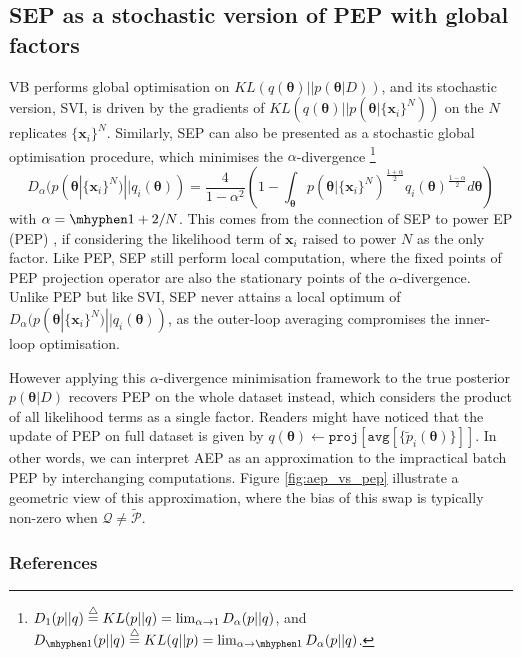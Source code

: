 \documentclass{article} %
\begin{document}
\subsection{SEP as a stochastic version of PEP with global factors}
VB performs global optimisation on $KL(q(\bm{\theta})||p(\bm{\theta}|D))$, and its stochastic version, SVI, is driven by the gradients of $KL(q(\bm{\theta}) || p(\bm{\theta} | \{\bm{x}_i\}^N))$ on the $N$ replicates $\{\bm{x}_i\}^N$. Similarly, SEP can also be presented as a stochastic global optimisation procedure, which minimises the $\alpha$-divergence \footnote{$D_{1}(p||q) \buildrel\triangle\over = KL(p || q) = \lim_{\alpha \rightarrow 1} D_{\alpha}(p||q)$, and $D_{ \mhyphen 1}(p||q) \buildrel\triangle\over = KL(q || p) = \lim_{\alpha \rightarrow \mhyphen 1} D_{\alpha}(p || q)$. } \cite{amari:ig1985}
\begin{equation}
D_{\alpha}(p(\bm{\theta} | \{\bm{x}_i\}^N) || q_i(\bm{\theta})) = \frac{4}{1 - \alpha^2} 
		\left( 1 - \int_{\bm{\theta}} p(\bm{\theta} | \{\bm{x}_i\}^N)^{\frac{1+\alpha}{2}} q_i(\bm{\theta})^{\frac{1-\alpha}{2}} d\bm{\theta} \right)
\end{equation} 
with $\alpha = \mhyphen 1 + 2/N$. This comes from the connection of SEP to power EP (PEP) \cite{minka:powerep}, if considering the likelihood term of $\bm{x}_i$ raised to power $N$ as the only factor. Like PEP, SEP still perform local computation, where the fixed points of PEP projection operator are also the stationary points of the $\alpha$-divergence. Unlike PEP but like SVI, SEP never attains a local optimum of $D_{\alpha}(p(\bm{\theta} | \{\bm{x}_i\}^N) || q_i(\bm{\theta}))$, as the outer-loop averaging compromises the inner-loop optimisation.

%
However applying this $\alpha$-divergence minimisation framework to the true posterior $p(\bm{\theta}|D)$ recovers PEP on the whole dataset instead, which considers the product of all likelihood terms as a single factor. Readers might have noticed that the update of PEP on full dataset is given by $q(\bm{\theta}) \leftarrow \mathtt{proj}[\mathtt{avg}[\{ \tilde{p}_i(\bm{\theta}) \}]]$. In other words, we can interpret AEP as an approximation to the impractical batch PEP by interchanging computations. Figure \ref{fig:aep_vs_pep} illustrate a geometric view of this approximation, where the bias of this swap is typically non-zero when $\mathcal{Q} \neq \tilde{\mathcal{P}}$.


\subsubsection*{References}
\renewcommand{\section}[2]{}


\end{document}
